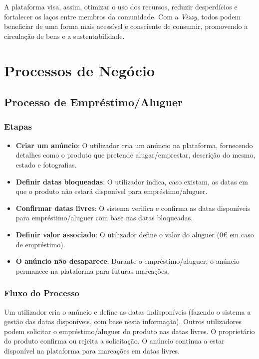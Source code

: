 \documentclass[a4paper, 12pt]{article} %
\begin{document}
A plataforma visa, assim, otimizar o uso dos recursos, reduzir desperdícios e fortalecer os laços entre membros da comunidade. Com a \textit{Vizzy}, todos podem beneficiar de uma forma mais acessível e consciente de consumir, promovendo a circulação de bens e a sustentabilidade.


\newpage
\section{Processos de Negócio}

\subsection{Processo de Empréstimo/Aluguer}

\subsubsection{Etapas}
\begin{itemize}
	\item \textbf{Criar um anúncio}: O utilizador cria um anúncio na plataforma, fornecendo detalhes como o produto que pretende alugar/emprestar, descrição do mesmo, estado e fotografias.
	\item \textbf{Definir datas bloqueadas}: O utilizador indica, caso existam, as datas em que o produto não estará disponível para empréstimo/aluguer.
	\item \textbf{Confirmar datas livres}: O sistema verifica e confirma as datas disponíveis para empréstimo/aluguer com base nas datas bloqueadas.
	\item \textbf{Definir valor associado}: O utilizador define o valor do aluguer (0€ em caso de empréstimo).
	\item \textbf{O anúncio não desaparece}: Durante o empréstimo/aluguer, o anúncio permanece na plataforma para futuras marcações.
\end{itemize}

\subsubsection{Fluxo do Processo}
Um utilizador cria o anúncio e define as datas indisponíveis (fazendo o sistema a gestão das datas disponíveis, com base nesta informação). Outros utilizadores podem solicitar o empréstimo/aluguer do produto nas datas livres. O proprietário do produto confirma ou rejeita a solicitação. O anúncio continua a estar disponível na plataforma para marcações em datas livres.
\end{document}
